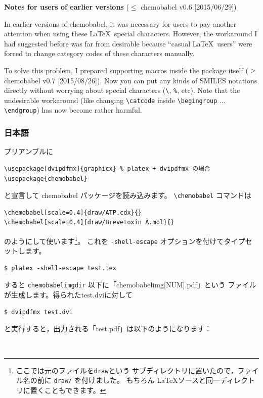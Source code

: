 \documentclass[dvipdfmx,12pt]{jsarticle}
\begin{document}
\noindent \textbf{Notes for users of earlier versions} ($\le$ \textsf{chemobabel} v0.6 [2015/06/29])

In earlier versions of \textsf{chemobabel}, it was necessary for users
to pay another attention when using these \LaTeX\ special characters.
However, the workaround I had suggested before was far from desirable
because ``casual \LaTeX\ users'' were forced to change category codes
of these characters manually.

To solve this problem, I prepared supporting macros inside the package
itself ($\ge$ \textsf{chemobabel} v0.7 [2015/08/26]).
Now you can put any kinds of SMILES notations directly without worrying
about special characters (\verb|\|, \verb|%|, etc).
Note that the undesirable workaround (like changing \verb|\catcode| inside
\verb|\begingroup| ... \verb|\endgroup|) has now become rather harmful.

\clearpage

\subsubsection{日本語}

プリアンブルに
\begin{verbatim}
\usepackage[dvipdfmx]{graphicx} % platex + dvipdfmx の場合
\usepackage{chemobabel}
\end{verbatim}
と宣言して \textsf{chemobabel} パッケージを読み込みます。
\verb|\chemobabel| コマンドは
\begin{verbatim}
\chemobabel[scale=0.4]{draw/ATP.cdx}{}
\chemobabel[scale=0.4]{draw/Brevetoxin A.mol}{}
\end{verbatim}
のようにして使います\footnote{ここでは元のファイルを\texttt{draw}という
サブディレクトリに置いたので，ファイル名の前に \texttt{draw/} を付けました。
もちろん \LaTeX ソースと同一ディレクトリに置くこともできます。}。
これを \verb|-shell-escape| オプションを付けてタイプセットします。
\begin{verbatim}
$ platex -shell-escape test.tex
\end{verbatim}
すると \verb|chemobabelimgdir| 以下に「chemobabelimg[NUM].pdf」という
ファイルが生成します。得られたtest.dviに対して
\begin{verbatim}
$ dvipdfmx test.dvi
\end{verbatim}
と実行すると，出力される「test.pdf」は以下のようになります：
\begin{figure}[h]
  \centering
   \\
\end{figure}
\end{document}
